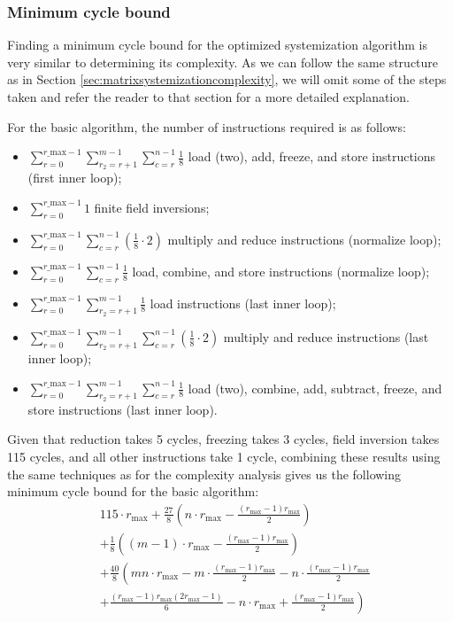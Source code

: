\documentclass[11pt,a4paper]{report}
\theoremstyle{definition}
\begin{document}
\subsubsection{Minimum cycle bound}
Finding a minimum cycle bound for the optimized systemization algorithm is very similar to determining its complexity. As we can follow the same structure as in Section \ref{sec:matrixsystemizationcomplexity}, we will omit some of the steps taken and refer the reader to that section for a more detailed explanation.

For the basic algorithm, the number of instructions required is as follows:
\begin{itemize}
  \item $\sum_{r=0}^{r\_\text{max}-1} \sum_{r_2=r+1}^{m-1} \sum_{c=r}^{n-1} \frac{1}{8}$ load (two), add, freeze, and store instructions (first inner loop);
  \item $\sum_{r=0}^{r\_\text{max}-1} 1$ finite field inversions;
  \item $\sum_{r=0}^{r\_\text{max}-1} \sum_{c=r}^{n-1} (\frac{1}{8} \cdot 2)$ multiply and reduce instructions (normalize loop);
  \item $\sum_{r=0}^{r\_\text{max}-1} \sum_{c=r}^{n-1} \frac{1}{8}$ load, combine, and store instructions (normalize loop);
  \item $\sum_{r=0}^{r\_\text{max}-1} \sum_{r_2=r+1}^{m-1} \frac{1}{8}$ load instructions (last inner loop);
  \item $\sum_{r=0}^{r\_\text{max}-1} \sum_{r_2=r+1}^{m-1} \sum_{c=r}^{n-1} (\frac{1}{8} \cdot 2)$ multiply and reduce instructions (last inner loop);
  \item $\sum_{r=0}^{r\_\text{max}-1} \sum_{r_2=r+1}^{m-1} \sum_{c=r}^{n-1} \frac{1}{8}$ load (two), combine, add, subtract, freeze, and store instructions (last inner loop).
\end{itemize}
Given that reduction takes 5 cycles, freezing takes 3 cycles, field inversion takes 115 cycles, and all other instructions take 1 cycle, combining these results using the same techniques as for the complexity analysis gives us the following minimum cycle bound for the basic algorithm:
\begin{align*}
  & 115 \cdot r_\text{max} + \frac{27}{8} \left( n \cdot r_\text{max} - \frac{(r_\text{max} - 1)r_{\text{max}}}{2} \right)\\
  & + \frac{1}{8} \left( (m-1) \cdot r_\text{max} - \frac{(r_\text{max} - 1)r_{\text{max}}}{2} \right) \\
  & + \frac{40}{8} \left( mn \cdot r_\text{max} - m \cdot \frac{(r_\text{max} - 1)r_{\text{max}}}{2} - n \cdot \frac{(r_\text{max} - 1)r_{\text{max}}}{2} \right. \\
  & \left. + \frac{(r_\text{max} - 1)r_{\text{max}}(2r_{\text{max}} - 1)}{6} - n \cdot r_\text{max} + \frac{(r_\text{max} - 1)r_{\text{max}}}{2} \right)
\end{align*}
\end{document}
